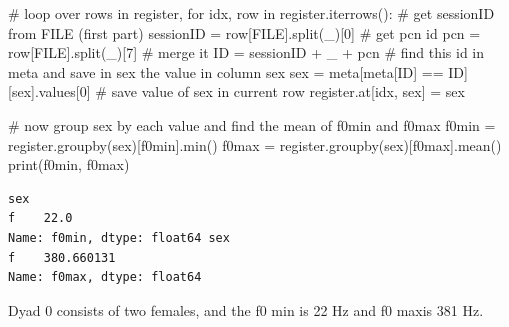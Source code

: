 \documentclass[
  letterpaper,
  DIV=11,
  numbers=noendperiod]{scrreprt}
\newenvironment{Shaded}{\begin{snugshade}}{\end{snugshade}}
\newcommand{\BuiltInTok}[1]{\textcolor[rgb]{0.00,0.23,0.31}{#1}}
\newcommand{\CommentTok}[1]{\textcolor[rgb]{0.37,0.37,0.37}{#1}}
\newcommand{\ControlFlowTok}[1]{\textcolor[rgb]{0.00,0.23,0.31}{#1}}
\newcommand{\DecValTok}[1]{\textcolor[rgb]{0.68,0.00,0.00}{#1}}
\newcommand{\KeywordTok}[1]{\textcolor[rgb]{0.00,0.23,0.31}{#1}}
\newcommand{\NormalTok}[1]{\textcolor[rgb]{0.00,0.23,0.31}{#1}}
\newcommand{\OperatorTok}[1]{\textcolor[rgb]{0.37,0.37,0.37}{#1}}
\newcommand{\StringTok}[1]{\textcolor[rgb]{0.13,0.47,0.30}{#1}}
\begin{document}
\begin{Shaded}
\begin{Highlighting}[]
\CommentTok{\# loop over rows in register,}
\ControlFlowTok{for}\NormalTok{ idx, row }\KeywordTok{in}\NormalTok{ register.iterrows():}
    \CommentTok{\#  get sessionID from FILE (first part)}
\NormalTok{    sessionID }\OperatorTok{=}\NormalTok{ row[}\StringTok{\textquotesingle{}FILE\textquotesingle{}}\NormalTok{].split(}\StringTok{\textquotesingle{}\_\textquotesingle{}}\NormalTok{)[}\DecValTok{0}\NormalTok{]}
    \CommentTok{\# get pcn id}
\NormalTok{    pcn }\OperatorTok{=}\NormalTok{ row[}\StringTok{\textquotesingle{}FILE\textquotesingle{}}\NormalTok{].split(}\StringTok{\textquotesingle{}\_\textquotesingle{}}\NormalTok{)[}\DecValTok{7}\NormalTok{]}
    \CommentTok{\# merge it}
\NormalTok{    ID }\OperatorTok{=}\NormalTok{ sessionID }\OperatorTok{+} \StringTok{\textquotesingle{}\_\textquotesingle{}} \OperatorTok{+}\NormalTok{ pcn}
    \CommentTok{\# find this id in meta and save in sex the value in column sex}
\NormalTok{    sex }\OperatorTok{=}\NormalTok{ meta[meta[}\StringTok{\textquotesingle{}ID\textquotesingle{}}\NormalTok{] }\OperatorTok{==}\NormalTok{ ID][}\StringTok{\textquotesingle{}sex\textquotesingle{}}\NormalTok{].values[}\DecValTok{0}\NormalTok{]}
    \CommentTok{\# save value of sex in current row}
\NormalTok{    register.at[idx, }\StringTok{\textquotesingle{}sex\textquotesingle{}}\NormalTok{] }\OperatorTok{=}\NormalTok{ sex}

\CommentTok{\# now group sex by each value and find the mean of f0min and f0max}
\NormalTok{f0min }\OperatorTok{=}\NormalTok{ register.groupby(}\StringTok{\textquotesingle{}sex\textquotesingle{}}\NormalTok{)[}\StringTok{\textquotesingle{}f0min\textquotesingle{}}\NormalTok{].}\BuiltInTok{min}\NormalTok{()}
\NormalTok{f0max }\OperatorTok{=}\NormalTok{ register.groupby(}\StringTok{\textquotesingle{}sex\textquotesingle{}}\NormalTok{)[}\StringTok{\textquotesingle{}f0max\textquotesingle{}}\NormalTok{].mean()}
\BuiltInTok{print}\NormalTok{(f0min, f0max)}
\end{Highlighting}
\end{Shaded}

\begin{verbatim}
sex
f    22.0
Name: f0min, dtype: float64 sex
f    380.660131
Name: f0max, dtype: float64
\end{verbatim}

Dyad 0 consists of two females, and the f0 min is 22 Hz and f0 maxis 381
Hz.
\end{document}

